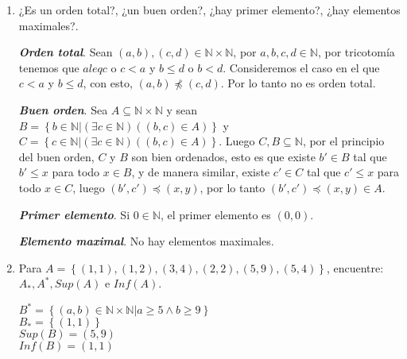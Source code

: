 \documentclass{report}
\begin{document}
\begin{enumerate}
\begin{enumerate}
        \item ¿Es un orden total?, ¿un buen orden?, ¿hay primer elemento?, ¿hay elementos maximales?.
        
        \textit{\textbf{Orden total}}. Sean $(a,b), (c,d) \in \mathbb{N} \times \mathbb{N}$, por $a,b,c,d \in \mathbb{N}$, por tricotomía tenemos que $a leq c$ o $c < a$ y $b\leq d$ o $b< d$. Consideremos el caso en el que $c < a$ y $b \leq d$, con esto, $(a,b) \not \preceq (c,d)$. Por lo tanto no es orden total.

        \textit{\textbf{Buen orden}}. Sea $A \subseteq \mathbb{N} \times \mathbb{N}$ y sean $B = \left\{b \in \mathbb{N} | (\exists c \in \mathbb{N})((b,c)\in A)\right\}$ y $C = \left\{c \in \mathbb{N} | (\exists c \in \mathbb{N})((b,c)\in A)\right\}$. Luego $C, B \subseteq \mathbb{N}$, por el principio del buen orden, $C$ y $B$ son bien ordenados, esto es que existe $b' \in B$ tal que $b' \leq x$ para todo $x \in B$, y de manera similar, existe $c' \in C$ tal que $c' \leq x$ para todo $x \in C$, luego $(b',c') \preceq (x,y)$, por lo tanto $(b',c') \preceq (x,y) \in A$.

        \textit{\textbf{Primer elemento}}. Si $0 \in \mathbb{N}$, el primer elemento es $(0,0)$.

        \textit{\textbf{Elemento maximal}}. No hay elementos maximales.

        \item Para $A = \left\{(1,1),(1,2),(3,4),(2,2),(5,9),(5,4)\right\}$, encuentre: $A_*, A^*, Sup(A)$ e $Inf(A)$.
        
        $B^* = \left\{(a,b) \in \mathbb{N} \times \mathbb{N} | a \geq 5 \wedge b \geq 9\right\}$\\
        $B_* = \left\{(1,1)\right\}$\\
        $Sup(B) = (5,9)$\\
        $Inf(B) = (1,1)$\\
    \end{enumerate}
\end{enumerate}
\end{document}
